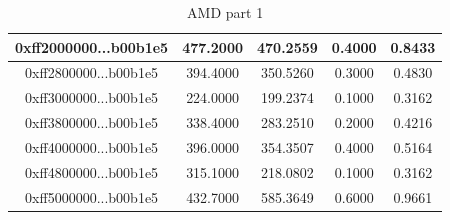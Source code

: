 \documentclass[12pt, a4paper]{article}
\begin{document}
\begin{table}[H]
\begin{tabular}{|c|c|c|c|c|}
0xff2000000...b00b1e5 &       477.2000 &       470.2559 &         0.4000 &        0.8433 \\ \hline
0xff2800000...b00b1e5 &       394.4000 &       350.5260 &         0.3000 &        0.4830 \\ \hline
0xff3000000...b00b1e5 &       224.0000 &       199.2374 &         0.1000 &        0.3162 \\ \hline
0xff3800000...b00b1e5 &       338.4000 &       283.2510 &         0.2000 &        0.4216 \\ \hline
0xff4000000...b00b1e5 &       396.0000 &       354.3507 &         0.4000 &        0.5164 \\ \hline
0xff4800000...b00b1e5 &       315.1000 &       218.0802 &         0.1000 &        0.3162 \\ \hline
0xff5000000...b00b1e5 &       432.7000 &       585.3649 &         0.6000 &        0.9661 \\ \hline
    \end{tabular}
    \caption{AMD part 1}
    \label{tab:amd_1}
\end{table}
\end{document}
